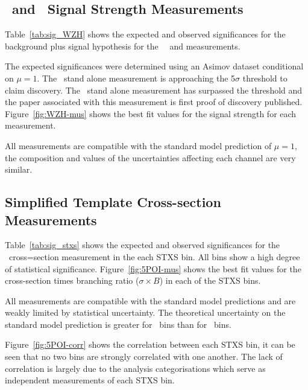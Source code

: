 \subsection{\WH\ and \ZH\ Signal Strength Measurements}
Table~\ref{tab:sig_WZH} shows the expected and observed significances for
the background plus signal hypothesis for the \WH\, \ZH\ and \VH measurements.

The expected significances were determined using an Asimov dataset conditional
on $\mu=1$. The \WH\ stand alone measurement is approaching the 5$\sigma$
threshold to claim discovery. The \ZH\ stand alone measurement has surpassed the
threshold and the paper associated with this measurement is first proof of
discovery published. Figure~\ref{fig:WZH-mus}
shows the best fit values for the signal strength for each measurement.

All measurements are compatible with the standard model prediction of $\mu=1$,
the composition and values of the uncertainties affecting each channel are very
similar.
\clearpage

\subsection{Simplified Template Cross-section Measurements}
Table~\ref{tab:sig_stxs} shows the expected and observed significances for
the \VHbb\ cross=section measurement in the each STXS bin. All bins show a high
degree of statistical significance. Figure~\ref{fig:5POI-mus} shows the best fit
values for the cross-section times branching ratio ($\sigma \times B$) in each
of the STXS bins.

All measurements are compatible with the standard model predictions and are
weakly limited by statistical uncertainty. The theoretical uncertainty on the
standard  model prediction is greater for \ZH\ bins than for \WH\ bins.

Figure~\ref{fig:5POI-corr} shows the correlation between each STXS bin, it can
be seen that no two bins are strongly correlated with one another. The lack of
correlation is largely due to the analysis categorisations which serve as
independent measurements of each STXS bin.

%
%
